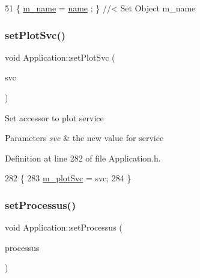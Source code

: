 \begin{DoxyCode}
51 \{ \hyperlink{classObject_a8b83c95c705d2c3ba0d081fe1710f48d}{m\_name}  = \hyperlink{classObject_a300f4c05dd468c7bb8b3c968868443c1}{name}  ; \} \textcolor{comment}{//< Set Object m\_name}
\end{DoxyCode}
\mbox{\label{classApplication_ac11402510105adf9a9ccf3daa25ea7d4}} 
\subsubsection{\texorpdfstring{set\+Plot\+Svc()}{setPlotSvc()}}
{\footnotesize\ttfamily void Application\+::set\+Plot\+Svc (\begin{DoxyParamCaption}\item[{\hyperlink{Application_8h_abaa10d33ca2837dfcf8ba9bff40cdbb6}{Plot\+Svc}}]{svc }\end{DoxyParamCaption})\hspace{0.3cm}{\ttfamily [inline]}}

Set accessor to plot service 
\begin{DoxyParams}{Parameters}
{\em svc} & the new value for service \\
\hline
\end{DoxyParams}


Definition at line 282 of file Application.\+h.


\begin{DoxyCode}
282                                  \{
283     \hyperlink{classApplication_a30d5600ea5e4f36b14f25f903ee3256e}{m\_plotSvc} = svc;
284   \}
\end{DoxyCode}
\mbox{\label{classApplication_a8ed8a66653bb6e665e05a735519c5d5b}} 
\subsubsection{\texorpdfstring{set\+Processus()}{setProcessus()}}
{\footnotesize\ttfamily void Application\+::set\+Processus (\begin{DoxyParamCaption}\item[{\hyperlink{classProcessus}{Processus} $\ast$}]{processus }\end{DoxyParamCaption})\hspace{0.3cm}{\ttfamily [inline]}}

